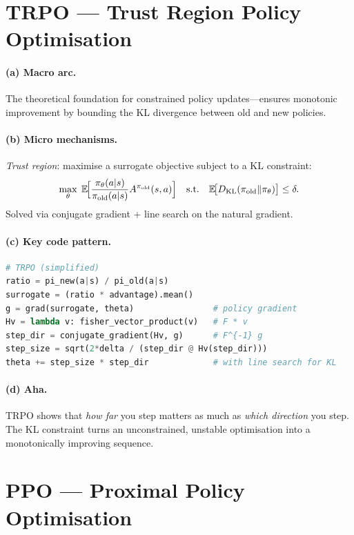\section{TRPO --- Trust Region Policy Optimisation}
\label{sec:trpo}

\paragraph{(a) Macro arc.}
The theoretical foundation for constrained policy updates---ensures monotonic improvement by bounding the KL divergence between old and new policies.

\paragraph{(b) Micro mechanisms.}
\emph{Trust region}: maximise a surrogate objective subject to a KL constraint:
\[
  \max_\theta\; \mathbb{E}\!\Bigl[\frac{\pi_\theta(a|s)}{\pi_{\text{old}}(a|s)} A^{\pi_{\text{old}}}(s,a)\Bigr]
  \quad\text{s.t.}\quad \mathbb{E}\!\bigl[D_{\text{KL}}(\pi_{\text{old}}\|\pi_\theta)\bigr] \le \delta.
\]
Solved via conjugate gradient + line search on the natural gradient.

\paragraph{(c) Key code pattern.}

\begin{lstlisting}[language=Python]
# TRPO (simplified)
ratio = pi_new(a|s) / pi_old(a|s)
surrogate = (ratio * advantage).mean()
g = grad(surrogate, theta)                # policy gradient
Hv = lambda v: fisher_vector_product(v)   # F * v
step_dir = conjugate_gradient(Hv, g)      # F^{-1} g
step_size = sqrt(2*delta / (step_dir @ Hv(step_dir)))
theta += step_size * step_dir             # with line search for KL
\end{lstlisting}

\paragraph{(d) Aha.}
TRPO shows that \emph{how far} you step matters as much as \emph{which direction} you step.
The KL constraint turns an unconstrained, unstable optimisation into a monotonically improving sequence.

\section{PPO --- Proximal Policy Optimisation}
\label{sec:ppo}

